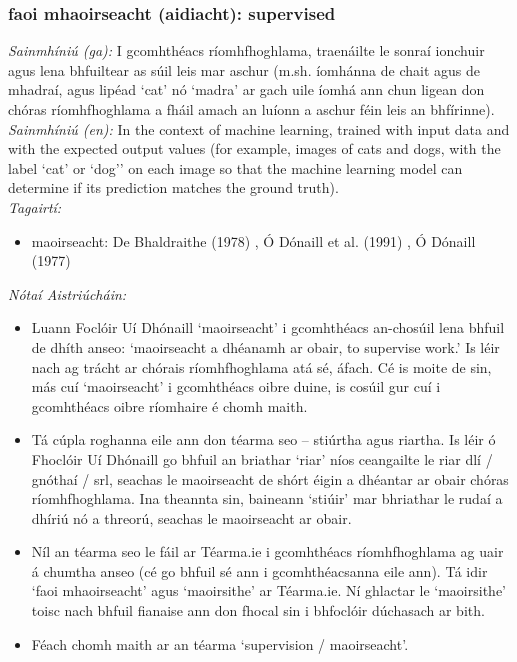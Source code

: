\subsubsection*{faoi mhaoirseacht (aidiacht): supervised}
 \noindent \textit{Sainmhíniú (ga):} I gcomhthéacs ríomhfhoghlama, traenáilte le sonraí ionchuir agus lena bhfuiltear as súil leis mar aschur (m.sh. íomhánna de chait agus de mhadraí, agus lipéad `cat' nó `madra' ar gach uile íomhá ann chun ligean don chóras ríomhfhoghlama a fháil amach an luíonn a aschur féin leis an bhfírinne).
\\
 \noindent \textit{Sainmhíniú (en):} In the context of machine learning, trained with input data and with the expected output values (for example, images of cats and dogs, with the label `cat' or `dog'' on each image so that the machine learning model can determine if its prediction matches the ground truth).
\\
 \noindent \textit{Tagairtí:}
\begin{itemize}
	\item maoirseacht: De Bhaldraithe (1978) \cite{de-bhaldraithe}, Ó Dónaill et al. (1991) \cite{focloir-beag}, Ó Dónaill (1977) \cite{odonaill}
\end{itemize}

 \noindent \textit{Nótaí Aistriúcháin:}
\begin{itemize}
	\item Luann Foclóir Uí Dhónaill `maoirseacht' i gcomhthéacs an-chosúil lena bhfuil de dhíth anseo: `maoirseacht a dhéanamh ar obair, to supervise work.' Is léir nach ag trácht ar chórais ríomhfhoghlama atá sé, áfach. Cé is moite de sin, más cuí `maoirseacht' i gcomhthéacs oibre duine, is cosúil gur cuí i gcomhthéacs oibre ríomhaire é chomh maith.
	\item Tá cúpla roghanna eile ann don téarma seo -- stiúrtha agus riartha. Is léir ó Fhoclóir Uí Dhónaill go bhfuil an briathar `riar' níos ceangailte le riar dlí / gnóthaí / srl, seachas le maoirseacht de shórt éigin a dhéantar ar obair chóras ríomhfhoghlama. Ina theannta sin, baineann `stiúir' mar bhriathar le rudaí a dhíriú nó a threorú, seachas le maoirseacht ar obair.
	\item Níl an téarma seo le fáil ar Téarma.ie i gcomhthéacs ríomhfhoghlama ag uair á chumtha anseo (cé go bhfuil sé ann i gcomhthéacsanna eile ann). Tá idir `faoi mhaoirseacht' agus `maoirsithe' ar Téarma.ie. Ní ghlactar le `maoirsithe' toisc nach bhfuil fianaise ann don fhocal sin i bhfoclóir dúchasach ar bith.
	\item Féach chomh maith ar an téarma `supervision / maoirseacht'.
\end{itemize}


